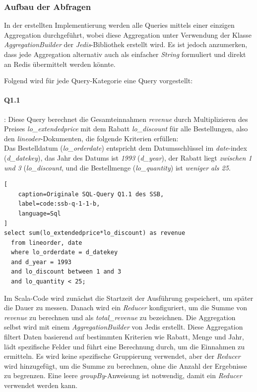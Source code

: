 \subsubsection{Aufbau der Abfragen}
In der erstellten Implementierung werden alle Queries mittels einer einzigen Aggregation durchgeführt, wobei diese Aggregation unter Verwendung der Klasse\\ \emph{AggregationBuilder} der \emph{Jedis}-Bibliothek erstellt wird.
Es ist jedoch anzumerken, dass jede Aggregation alternativ auch als einfacher \emph{String} formuliert und direkt an Redis übermittelt werden könnte.

Folgend wird für jede Query-Kategorie eine Query vorgestellt:

\paragraph{Q1.1}: Diese Query berechnet die Gesamteinnahmen \emph{revenue} durch Multiplizieren des Preises \emph{lo\_extendedprice} mit dem Rabatt \emph{lo\_discount} für alle Bestellungen, also den \emph{lineoder}-Dokumenten, die folgende Kriterien erfüllen:\\
Das Bestelldatum (\emph{lo\_orderdate}) entspricht dem Datumsschlüssel im \emph{date}-index\\
(\emph{d\_datekey}), das Jahr des Datums ist \emph{1993} (\emph{d\_year}), der Rabatt liegt \emph{zwischen 1 und 3} (\emph{lo\_discount}, und die Bestellmenge (\emph{lo\_quantity}) ist \emph{weniger als 25}. 

\begin{lstlisting}[
    caption=Originale SQL-Query Q1.1 des SSB,
    label=code:ssb-q-1-1-b,
    language=Sql
]
select sum(lo_extendedprice*lo_discount) as revenue
  from lineorder, date
  where lo_orderdate = d_datekey
  and d_year = 1993
  and lo_discount between 1 and 3
  and lo_quantity < 25;
\end{lstlisting}


Im Scala-Code wird zunächst die Startzeit der Ausführung gespeichert, um später die Dauer zu messen. Danach wird ein \emph{Reducer} konfiguriert, um die Summe von \emph{revenue} zu berechnen und als \emph{total\_revenue} zu bezeichnen. Die Aggregation selbst wird mit einem \emph{AggregationBuilder} von Jedis erstellt. Diese Aggregation filtert Daten basierend auf bestimmten Kriterien wie Rabatt, Menge und Jahr, lädt spezifische Felder und führt eine Berechnung durch, um die Einnahmen zu ermitteln. Es wird keine spezifische Gruppierung verwendet, aber der \emph{Reducer} wird hinzugefügt, um die Summe zu berechnen, ohne die Anzahl der Ergebnisse zu begrenzen. Eine leere \emph{groupBy}-Anweisung ist notwendig, damit ein \emph{Reducer} verwendet werden kann.

